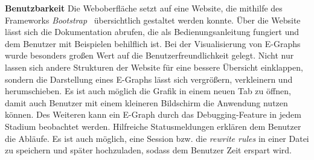 \noindent\textbf{Benutzbarkeit} Die Weboberfläche setzt auf eine Website, die mithilfe des Frameworks \textit{Bootstrap}~\cite{bootstrap} übersichtlich gestaltet werden konnte.
Über die Website lässt sich die Dokumentation abrufen, die als Bedienungsanleitung fungiert und dem Benutzer mit Beispielen behilflich ist.
Bei der Visualisierung von E-Graphs wurde besonders großen Wert auf die Benutzerfreundlichkeit gelegt. Nicht nur lassen sich andere Strukturen der Website für eine bessere Übersicht 
einklappen, sondern die Darstellung eines E-Graphs lässt sich vergrößern, verkleinern und herumschieben. Es ist auch möglich die Grafik in einem neuen Tab zu öffnen, damit auch Benutzer
mit einem kleineren Bildschirm die Anwendung nutzen können.
Des Weiteren kann ein E-Graph durch das Debugging-Feature in jedem Stadium beobachtet werden. Hilfreiche Statusmeldungen erklären dem Benutzer die Abläufe.
Es ist auch möglich, eine Session bzw. die \textit{rewrite rules} in einer Datei zu speichern und später hochzuladen, sodass dem Benutzer Zeit erspart wird.
